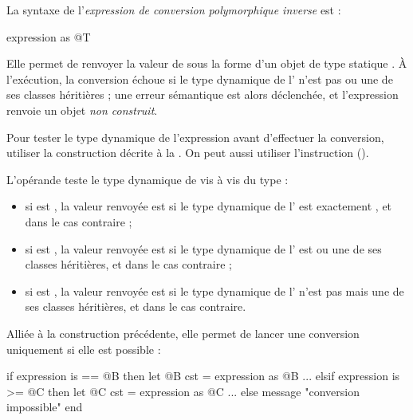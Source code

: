 La syntaxe de l'\emph{expression de conversion polymorphique inverse} est :

\begin {galgascode}
expression as @T
\end{galgascode}

Elle permet de renvoyer la valeur de  sous la forme d'un objet de type statique . À l'exécution, la conversion échoue si le type dynamique de l' n'est pas  ou une de ses classes héritières ; une erreur sémantique est alors déclenchée, et l'expression renvoie un objet \emph{non construit}.

Pour tester le type dynamique de l'expression avant d'effectuer la conversion, utiliser la construction décrite à la . On peut aussi utiliser l'instruction  ().








L'opérande  teste le type dynamique de  vis à vis du type  :
\begin{itemize}
\item si  est \galgas{==}, la valeur renvoyée est  si le type dynamique de l' est exactement , et  dans le cas contraire ;
\item si  est \galgas{>=}, la valeur renvoyée est  si le type dynamique de l' est  ou une de ses classes héritières, et  dans le cas contraire ;
\item si  est \galgas{>}, la valeur renvoyée est  si le type dynamique de l' n'est pas  mais une de ses classes héritières, et  dans le cas contraire.
\end{itemize}



Alliée à la construction précédente, elle permet de lancer une conversion uniquement si elle est possible :

\begin{galgascode}
if expression is == @B then
  let @B cst = expression as @B
  ...
elsif expression is >= @C then
  let @C cst = expression as @C
  ...
else
  message "conversion impossible"
end
\end{galgascode}






